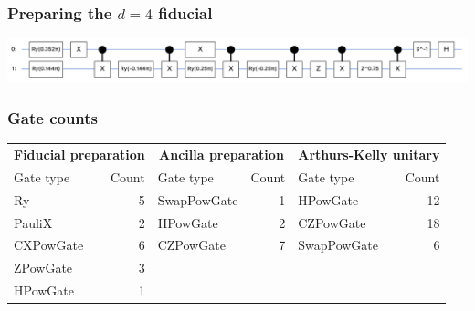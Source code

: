 \documentclass{beamer}
\begin{document}
\begin{frame}
\frametitle{Preparing the $d=4$ fiducial}
   \includegraphics[scale=0.28]{img/fiducial_prep}
\end{frame}

\begin{frame}
\frametitle{Gate counts}

\begin{small}
\begin{table}[h!]
\centering
\begin{tabular}{lr lr lr}
\toprule
\multicolumn{2}{c}{\textbf{Fiducial preparation}} & 
\multicolumn{2}{c}{\textbf{Ancilla preparation}} & 
\multicolumn{2}{c}{\textbf{Arthurs-Kelly unitary}} \\
\cmidrule(lr){1-2} \cmidrule(lr){3-4} \cmidrule(lr){5-6}
Gate type & Count & Gate type & Count & Gate type & Count \\
\midrule
Ry          & 5 & SwapPowGate & 1 & HPowGate    & 12 \\
PauliX      & 2 & HPowGate    & 2 & CZPowGate   & 18 \\
CXPowGate   & 6 & CZPowGate   & 7 & SwapPowGate & 6  \\
ZPowGate    & 3 &             &   &             &    \\
HPowGate    & 1 &             &   &             &    \\
\bottomrule
\end{tabular}
\label{tab:gate_counts}
\end{table}	
\end{small}
\end{frame}
\end{document}
